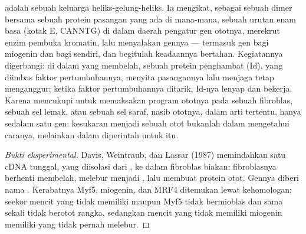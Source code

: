 \begin{proposition}\label{prop:b2:cell-differentiation:myod}
 adalah sebuah  keluarga heliks-gelung-heliks. Ia
mengikat, sebagai sebuah dimer bersama sebuah protein pasangan yang
ada di mana-mana, sebuah urutan enam basa (kotak E, CANNTG) di dalam
daerah pengatur gen ototnya, merekrut enzim pembuka kromatin, lalu
menyalakan gennya --- termasuk gen bagi miogenin dan bagi  sendiri,
dan begitulah keadaannya bertahan. Kegiatannya digerbangi: di dalam
 yang membelah, sebuah protein penghambat (Id), yang diimbas
faktor pertumbuhannya, menyita pasangannya lalu menjaga  tetap
menganggur; ketika faktor pertumbuhannya ditarik, Id-nya lenyap dan
 bekerja. Karena  mencukupi untuk memaksakan program ototnya
pada sebuah fibroblas, sebuah sel lemak, atau sebuah sel saraf, nasib
ototnya, dalam arti tertentu, hanya sedalam satu gen: kesukaran menjadi
sebuah otot bukanlah dalam mengetahui caranya, melainkan dalam
diperintah untuk itu.
\end{proposition}
\begin{proof}[Bukti eksperimental]
Davis, Weintraub, dan Lassar (1987) memindahkan satu cDNA tunggal, yang
diisolasi dari , ke dalam fibroblas biakan: fibroblasnya
berhenti membelah, melebur menjadi , lalu membuat protein otot.
Gennya diberi nama . Kerabatnya Myf5, miogenin, dan MRF4 ditemukan
lewat kehomologan; seekor mencit yang tidak memiliki  maupun Myf5
tidak bermioblas dan sama sekali tidak berotot rangka, sedangkan mencit
yang tidak memiliki miogenin memiliki  yang tidak pernah melebur.
\end{proof}

